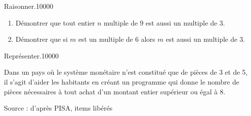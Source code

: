 \begin{pageExercices}
\begin{ExoCtN}{Raisonner.}{1}{0}{0}{0}{0}
\begin{enumerate}
\item Démontrer que tout entier $n$ multiple de $9$ est aussi un multiple de $3$.
\item Démontrer que si $m$ est un multiple de $6$ alors $m$ est aussi un multiple de $3$.
\end{enumerate}
\end{ExoCtN}


\begin{ExoCtN}{Représenter.}{1}{0}{0}{0}{0}

Dans un pays où le système monétaire n’est constitué que de pièces de 3 et de 5, il s’agit d’aider les habitants en créant un programme  qui donne le nombre de pièces nécessaires à tout achat d’un montant entier supérieur ou égal à 8.

\hfill{{\footnotesize Source : d’après PISA, items libérés}}

\end{ExoCtN}


\end{pageExercices}

  




